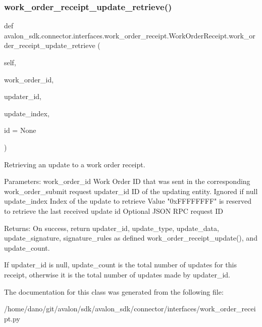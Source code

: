 \subsubsection{\texorpdfstring{work\+\_\+order\+\_\+receipt\+\_\+update\+\_\+retrieve()}{work\_order\_receipt\_update\_retrieve()}}
{\footnotesize\ttfamily def avalon\+\_\+sdk.\+connector.\+interfaces.\+work\+\_\+order\+\_\+receipt.\+Work\+Order\+Receipt.\+work\+\_\+order\+\_\+receipt\+\_\+update\+\_\+retrieve (\begin{DoxyParamCaption}\item[{}]{self,  }\item[{}]{work\+\_\+order\+\_\+id,  }\item[{}]{updater\+\_\+id,  }\item[{}]{update\+\_\+index,  }\item[{}]{id = {\ttfamily None} }\end{DoxyParamCaption})}

\begin{DoxyVerb}Retrieving an update to a work order receipt.

Parameters:
work_order_id Work Order ID that was sent in the
      corresponding work_order_submit request
updater_id    ID of the updating entity. Ignored if null
update_index  Index of the update to retrieve
      Value "0xFFFFFFFF" is reserved to retrieve the
      last received update
id            Optional JSON RPC request ID

Returns:
On success, return updater_id, update_type, update_data,
update_signature, signature_rules as defined
work_order_receipt_update(), and update_count.

If updater_id is null, update_count is the total number of
updates for this receipt, otherwise it is the total number
of updates made by updater_id.
\end{DoxyVerb}
 

The documentation for this class was generated from the following file\+:\begin{DoxyCompactItemize}
\item 
/home/dano/git/avalon/sdk/avalon\+\_\+sdk/connector/interfaces/work\+\_\+order\+\_\+receipt.\+py\end{DoxyCompactItemize}
